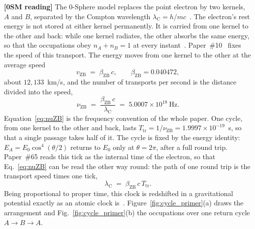 \documentclass[%
 reprint, amsmath,amssymb, aps, prb, ]{revtex4-2}
\numberwithin{equation}{section}
\newcommand{\iphase}{\theta}
\newcommand{\vZB}{v_{\text{ZB}}}
\newcommand{\betaZB}{\beta_{\text{ZB}}}
\newcommand{\lambdaC}{\lambda_{\text{C}}}
\newcommand{\nuZB}{\nu_{\text{ZB}}}
\newcommand{\Ttr}{T_{\text{tr}}}
\begin{document}
\textbf{[0SM reading]} The 0-Sphere model replaces the point electron by two kernels, $A$ and $B$, separated by the Compton wavelength $\lambdaC = h/mc$~\cite{hanamura01}. The electron's rest energy is not stored at either kernel permanently. It is carried from one kernel to the other and back: while one kernel radiates, the other absorbs the same energy, so that the occupations obey $n_A + n_B = 1$ at every instant~\cite{hanamura65}. Paper~\#10~\cite{hanamura10} fixes the speed of this transport. The energy moves from one kernel to the other at the average speed
\begin{equation}
\vZB \;=\; \betaZB\,c, \qquad \betaZB = 0.040472,
\label{eq:vZB}
\end{equation}
about $12{,}133$~km/s, and the number of transports per second is the distance divided into the speed,
\begin{equation}
\nuZB \;=\; \frac{\betaZB\,c}{\lambdaC} \;=\; 5.0007\times10^{18}\ \text{Hz}.
\label{eq:nuZB}
\end{equation}
Equation~\eqref{eq:nuZB} is the frequency convention of the whole paper. One cycle, from one kernel to the other and back, lasts $\Ttr = 1/\nuZB = 1.9997\times10^{-19}$~s, so that a single passage takes half of it. The cycle is fixed by the energy identity: $E_A = E_0\cos^{4}(\iphase/2)$ returns to $E_0$ only at $\iphase = 2\pi$, after a full round trip. Paper~\#65 reads this tick as the internal time of the electron, so that Eq.~\eqref{eq:nuZB} can be read the other way round: the path of one round trip is the transport speed times one tick,
\begin{equation}
\lambdaC \;=\; \betaZB\,c\,\Ttr .
\label{eq:clock}
\end{equation}
Being proportional to proper time, this clock is redshifted in a gravitational potential exactly as an atomic clock is~\cite{hanamura22,hanamura65}. Figure~\ref{fig:cycle_primer}(a) draws the arrangement and Fig.~\ref{fig:cycle_primer}(b) the occupations over one return cycle $A\to B\to A$.
\end{document}
